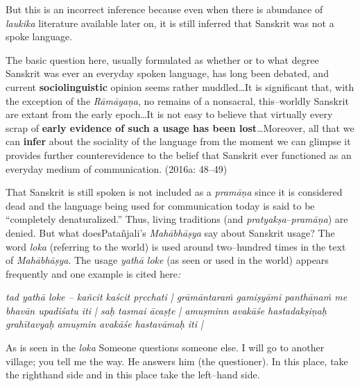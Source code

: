 But this is an incorrect inference because even when there is abundance of \textit{laukika} literature available later on, it is still inferred that Sanskrit was not a spoke language.

\begin{myquote}
The basic question here, usually formulated as whether or to what degree Sanskrit was ever an everyday spoken language, has long been debated, and current \textbf{sociolinguistic} opinion seems rather muddled…It is signiﬁcant that, with the exception of the \textit{Rāmāyaṇa}, no remains of a nonsacral, this–worldly Sanskrit are extant from the early epoch…It is not easy to believe that virtually every scrap of \textbf{early evidence of such a usage has been lost}…Moreover, all that we can \textbf{infer} about the sociality of the language from the moment we can glimpse it provides further counterevidence to the belief that Sanskrit ever functioned as an everyday medium of communication. (2016a: 48–49)
\end{myquote}

That Sanskrit is still spoken is not included as a \textit{pramāṇa} since it is considered dead and the language being used for communication today is said to be “completely denaturalized.” Thus, living traditions (and \textit{pratyakṣa}–\textit{pramāṇa}) are denied. But what doesPatañjali’s \textit{Mahābhāṣya }say about Sanskrit usage? The word \textit{loka} (referring to the world) is used around two–hundred times in the text of\textit{ Mahābhāṣya}. The usage \textit{yathā loke} (as seen or used in the world) appears frequently and one example is cited here\textit{:}

\begin{myquote}
\textit{tad yathā loke – kañcit kaścit pṛcchati | grāmāntaraṁ gamiṣyāmi panthānaṁ me bhavān upadiśatu iti | saḥ tasmai ācaṣṭe | amuṣminn avakāśe hastadakṣiṇaḥ grahītavyaḥ amuṣmin avakāśe hastavāmaḥ iti |}
\end{myquote}

\begin{myquote}
As is seen in the \textit{loka} Someone questions someone else. I will go to another village; you tell me the way. He answers him (the questioner). In this place, take the righthand side and in this place take the left–hand side.
\end{myquote}

